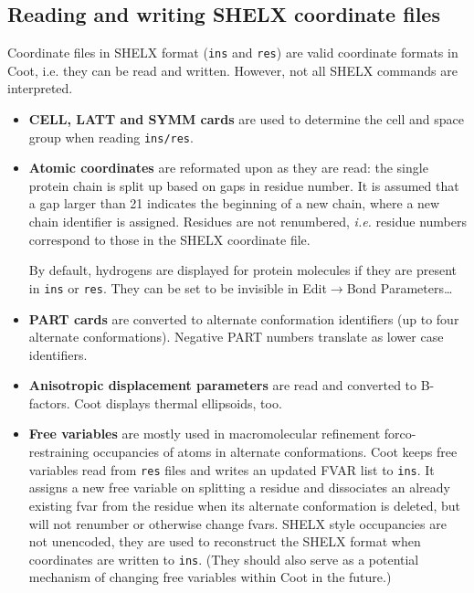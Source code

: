 \documentclass{article}
\begin{document}
\subsection{Reading and writing SHELX coordinate files}
Coordinate files in SHELX format (\texttt{ins} and \texttt{res}) are
valid coordinate formats in Coot, i.e. they can be read and written.
However, not all SHELX commands are interpreted.

\begin{itemize}

\item {\bf CELL, LATT and SYMM cards} are used to determine the cell
  and space group when reading \texttt{ins/res}.

\item {\bf Atomic coordinates} are reformated upon as they are read:
  the single protein chain is split up based on gaps in residue
  number. It is assumed that a gap larger than 21 indicates the
  beginning of a new chain, where a new chain identifier is assigned.
  Residues are not renumbered, \emph{i.e.} residue numbers correspond
  to those in the SHELX coordinate
  file. %

  By default, hydrogens are displayed for protein molecules if they
  are present in \texttt{ins} or \texttt{res}. They can be set to be
  invisible in \textsf{Edit$\to$Bond Parameters\ldots}

\item {\bf PART cards} are converted to alternate conformation
  identifiers (up to four alternate conformations). Negative PART
  numbers translate as lower case identifiers.

\item {\bf Anisotropic displacement parameters} are read and converted
  to B-factors. Coot displays thermal ellipsoids,
  too.%

\item {\bf Free variables} are mostly used in macromolecular
  refinement for\linebreak[4]co-restraining occupancies of atoms in
  alternate conformations. Coot keeps free variables read from
  \texttt{res} files and writes an updated FVAR list to \texttt{ins}.
  It assigns a new free variable on splitting a residue and
  dissociates an already existing fvar from the residue when its
  alternate conformation is deleted, but will not renumber or
  otherwise change fvars. SHELX style occupancies are not unencoded,
  they are used to reconstruct the SHELX format when coordinates are
  written to \texttt{ins}. (They should also serve as a potential
  mechanism of changing free variables within Coot in the future.)


\end{itemize}
\end{document}

